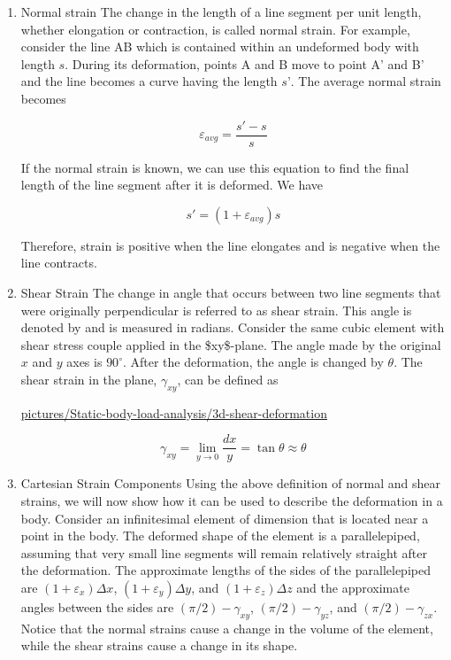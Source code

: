 \documentclass[a4paper,openany,12pt]{book}
\begin{document}
\begin{enumerate}
\item Normal strain
\label{normal-strain}
The change in the length of a line segment per unit length, whether
elongation or contraction, is called normal strain. For example,
consider the line AB which is contained within an undeformed body with
length \(s\). During its deformation, points A and B move to point A' and
B' and the line becomes a curve having the length \(s’\). The average
normal strain becomes

$$\varepsilon _{avg} = \frac{s' - s}{s}$$

If the normal strain is known, we can use this equation to find the
final length of the line segment after it is deformed. We have

$$s' = (1 + \varepsilon _{avg})s$$

Therefore, strain is positive when the line elongates and is negative
when the line contracts.

\item Shear Strain
\label{shear-strain}
The change in angle that occurs between two line segments that were
originally perpendicular is referred to as shear strain. This angle is
denoted by and is measured in radians. Consider the same cubic element
with shear stress couple applied in the \$xy\$-plane. The angle made by
the original \(x\) and \(y\) axes is \(90^{\circ}\). After the deformation, the
angle is changed by \(\theta\). The shear strain in the plane,
\(\gamma_{xy}\), can be defined as


\url{pictures/Static-body-load-analysis/3d-shear-deformation}

$$\gamma _{xy} = \mathop {\lim }\limits_{y \to 0} \frac{dx}{y} = \tan \theta  \approx \theta$$

\item Cartesian Strain Components
\label{cartesian-strain-components}
Using the above definition of normal and shear strains, we will now show
how it can be used to describe the deformation in a body. Consider an
infinitesimal element of dimension that is located near a point in the
body. The deformed shape of the element is a parallelepiped, assuming
that very small line segments will remain relatively straight after the
deformation. The approximate lengths of the sides of the parallelepiped
are \((1 + \varepsilon_x)\Delta x\), \((1 + \varepsilon_y)\Delta y\), and
\((1 + \varepsilon_z)\Delta z\) and the approximate angles between the
sides are \((\pi /2) - \gamma_{xy}\), \((\pi /2) - \gamma_{yz}\), and
\((\pi /2) - \gamma _{zx}\). Notice that the normal strains cause a change
in the volume of the element, while the shear strains cause a change in
its shape.
\end{enumerate}
\end{document}
